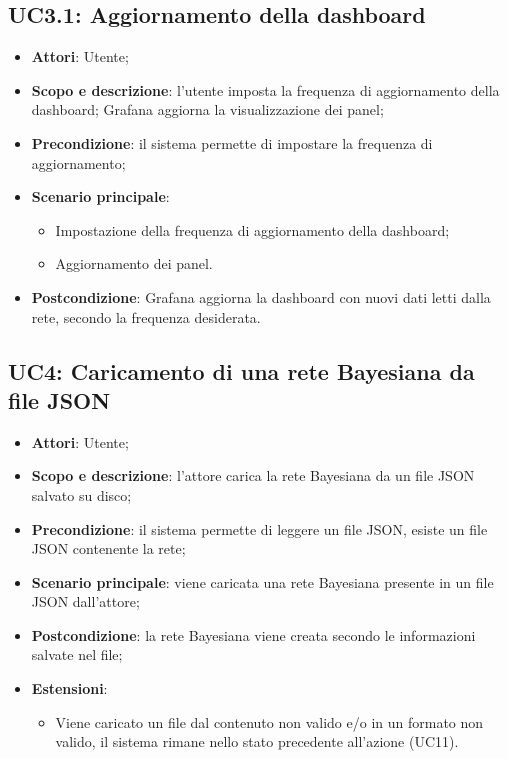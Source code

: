 \subsection{UC3.1: Aggiornamento della dashboard}
\hypertarget{UC3.1}{}
\begin{itemize}
	\item \textbf{Attori}: Utente;
	\item \textbf{Scopo e descrizione}: l'utente imposta la frequenza di aggiornamento della dashboard; Grafana aggiorna la visualizzazione dei panel;
	\item \textbf{Precondizione}: il sistema permette di impostare la frequenza di aggiornamento;
	\item \textbf{Scenario principale}:
	\begin{itemize}
		\item Impostazione della frequenza di aggiornamento della dashboard;
		\item Aggiornamento dei panel.
	\end{itemize}
	\item \textbf{Postcondizione}: Grafana aggiorna la dashboard con nuovi dati letti dalla rete, secondo la frequenza desiderata.
\end{itemize}

\subsection{UC4: Caricamento di una rete Bayesiana da file JSON}
\hypertarget{UC4}{}
\begin{itemize}
	\item \textbf{Attori}: Utente;
	\item \textbf{Scopo e descrizione}: l'attore carica la rete Bayesiana da un file JSON salvato su disco;
	\item \textbf{Precondizione}: il sistema permette di leggere un file JSON, esiste un file JSON contenente la rete;
	\item \textbf{Scenario principale}: viene caricata una rete Bayesiana presente in un file JSON dall'attore;
	\item \textbf{Postcondizione}: la rete Bayesiana viene creata secondo le informazioni salvate nel file;
	\item \textbf{Estensioni}:
	\begin{itemize}
		\item Viene caricato un file dal contenuto non valido e/o in un formato non valido, il sistema rimane nello stato precedente all'azione (UC11).
	\end{itemize}
\end{itemize}